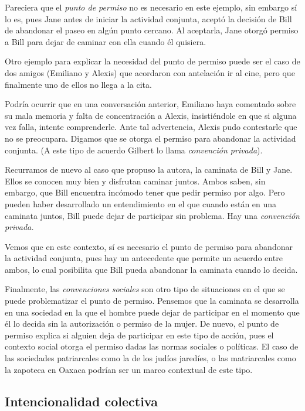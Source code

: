 \documentclass[oneside]{book}
\begin{document}
Pareciera que el \textit{punto de permiso} no es necesario en este ejemplo, sin embargo sí lo es, pues Jane antes de iniciar la actividad conjunta, aceptó la decisión de Bill de abandonar el paseo en algún punto cercano. Al aceptarla, Jane otorgó permiso a Bill para dejar de caminar con ella cuando él quisiera.

Otro ejemplo para explicar la necesidad del punto de permiso puede ser el caso de dos amigos (Emiliano y Alexis) que acordaron con antelación ir al cine, pero que finalmente uno de ellos no llega a la cita.

Podría ocurrir que en una conversación anterior, Emiliano haya comentado sobre su mala memoria y falta de concentración a Alexis, insistiéndole en que si alguna vez falla, intente comprenderle. Ante tal advertencia, Alexis pudo contestarle que no se preocupara. Digamos que se otorga el permiso para abandonar la actividad conjunta. (A este tipo de acuerdo Gilbert lo llama \textit{convención privada}).

Recurramos de nuevo al caso que propuso la autora, la caminata de Bill y Jane. Ellos se conocen muy bien y disfrutan caminar juntos. Ambos saben, sin embargo, que Bill encuentra incómodo tener que pedir permiso por algo. Pero pueden haber desarrollado un entendimiento en el que cuando están en una caminata juntos, Bill puede dejar de participar sin problema. Hay una \textit{convención privada. }

Vemos que en este contexto, sí es necesario el punto de permiso para abandonar la actividad conjunta, pues hay un antecedente que permite un acuerdo entre ambos, lo cual posibilita que Bill pueda abandonar la caminata cuando lo decida.

Finalmente, las \textit{convenciones sociales} son otro tipo de situaciones en el que se puede problematizar el punto de permiso. Pensemos que la caminata se desarrolla en una sociedad en la que el hombre puede dejar de participar en el momento que él lo decida sin la autorización o permiso de la mujer. De nuevo, el punto de permiso explica si alguien deja de participar en este tipo de acción, pues el contexto social otorga el permiso dadas las normas sociales o políticas. El caso de las sociedades patriarcales como la de los judíos jaredíes, o las matriarcales como la zapoteca en Oaxaca podrían ser un marco contextual de este tipo.

\subsection{Intencionalidad colectiva}
\end{document}
